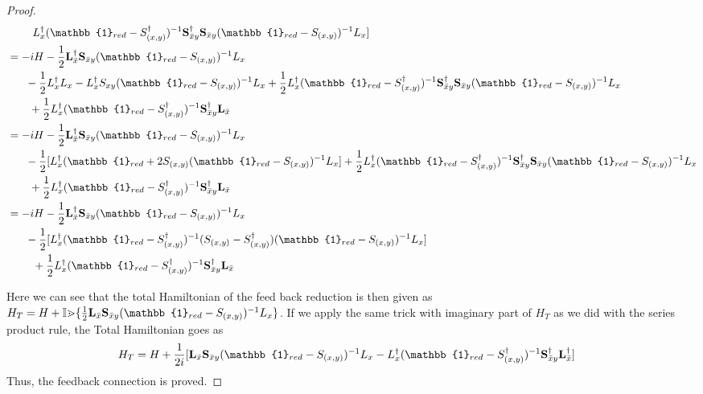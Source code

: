 \documentclass[a4paper]{article}
\theoremstyle{definition}
\begin{document}
\begin{enumerate}[label=(\roman*)]
\begin{proof}
\begin{align*}
    & \ \ \ \ \ \ \ L_x^\dagger (\mathbb{1}_{red}-S_{(x,y)}^\dagger )^{-1} \textbf{S}_{\Bar{x}y}^\dagger \textbf{S}_{\Bar{x}y}(\mathbb{1}_{red}-S_{(x,y)})^{-1} L_x ] \\ 
    & = -iH  - \frac{1}{2}\textbf{L}_{\Bar{x}}^\dagger \textbf{S}_{\Bar{x}y} (\mathbb{1}_{red}-S_{(x,y)})^{-1} L_x  \\
    & \ \ \ \ \  - \frac{1}{2}L_x^\dagger L_x - L_x^\dagger S_{xy}(\mathbb{1}_{red}-S_{(x,y)})^{-1} L_x + \frac{1}{2}L_x^\dagger (\mathbb{1}_{red}-S_{(x,y)}^\dagger )^{-1} \textbf{S}_{\Bar{x}y}^\dagger \textbf{S}_{\Bar{x}y}(\mathbb{1}_{red}-S_{(x,y)})^{-1} L_x \\
    & \ \ \ \ \ \ + \frac{1}{2}L_x^\dagger (\mathbb{1}_{red}-S_{(x,y)}^\dagger )^{-1} \textbf{S}_{\Bar{x}y}^\dagger \textbf{L}_{\Bar{x}} \\
    & = -iH  - \frac{1}{2}\textbf{L}_{\Bar{x}}^\dagger \textbf{S}_{\Bar{x}y} (\mathbb{1}_{red}-S_{(x,y)})^{-1} L_x  \\
    & \ \ \ \ \  - \frac{1}{2}[L_x^\dagger(\mathbb{1}_{red}+2S_{(x,y)} (\mathbb{1}_{red}-S_{(x,y)})^{-1}L_x] + \frac{1}{2}L_x^\dagger (\mathbb{1}_{red}-S_{(x,y)}^\dagger )^{-1} \textbf{S}_{\Bar{x}y}^\dagger \textbf{S}_{\Bar{x}y}(\mathbb{1}_{red}-S_{(x,y)})^{-1} L_x \\
    & \ \ \ \ \ \ + \frac{1}{2}L_x^\dagger (\mathbb{1}_{red}-S_{(x,y)}^\dagger )^{-1} \textbf{S}_{\Bar{x}y}^\dagger \textbf{L}_{\Bar{x}} \\
    & = -iH  - \frac{1}{2}\textbf{L}_{\Bar{x}}^\dagger \textbf{S}_{\Bar{x}y} (\mathbb{1}_{red}-S_{(x,y)})^{-1} L_x  \\
    & \ \ \ \ \  - \frac{1}{2}[L_x^\dagger(\mathbb{1}_{red}-S_{(x,y)}^\dagger )^{-1}(S_{(x,y)}-S_{(x,y)}^\dagger )(\mathbb{1}_{red}-S_{(x,y)})^{-1} L_x] \\
    & \ \ \ \ \ \ \ + \frac{1}{2}L_x^\dagger (\mathbb{1}_{red}-S_{(x,y)}^\dagger )^{-1} \textbf{S}_{\Bar{x}y}^\dagger \textbf{L}_{\Bar{x}} 
\end{align*}

Here we can see that the total Hamiltonian of the feed back reduction is then given as $H_T  = H + \mathbb{Im}\{ \frac{1}{2}\textbf{L}_{\Bar{x}}\textbf{S}_{\Bar{x}y} (\mathbb{1}_{red}-S_{(x,y)})^{-1} L_x\}$. If we apply the same trick with imaginary part of $H_T$ as we did with the series product rule, the Total Hamiltonian goes as
\begin{align*}
    H_T & = H + \frac{1}{2i}[\textbf{L}_{\Bar{x}}\textbf{S}_{\Bar{x}y} (\mathbb{1}_{red}-S_{(x,y)})^{-1} L_x  - L_x^\dagger (\mathbb{1}_{red}-S_{(x,y)}^\dagger )^{-1} \textbf{S}_{\Bar{x}y}^\dagger \textbf{L}_{\Bar{x}}^\dagger ]
\end{align*}
Thus, the feedback connection is proved.


\end{proof}
\end{enumerate}
\end{document}
